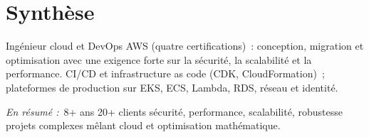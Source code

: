 \section*{Synth\`ese}

{\color{cvmuted}
Ingénieur cloud et DevOps AWS (quatre certifications)~: conception, migration et optimisation avec une exigence forte sur la s\'ecurit\'e, la scalabilit\'e et la performance. CI/CD et infrastructure as code (CDK, CloudFormation)~; plateformes de production sur EKS, ECS, Lambda, RDS, r\'eseau et identit\'e.

\smallskip
\noindent\textit{En r\'esum\'e :}\ 
8+ ans \textbullet{} 20+ clients \textbullet{} s\'ecurit\'e, performance, scalabilit\'e, robustesse \textbullet{} projets complexes m\^elant cloud et optimisation math\'ematique.
}
